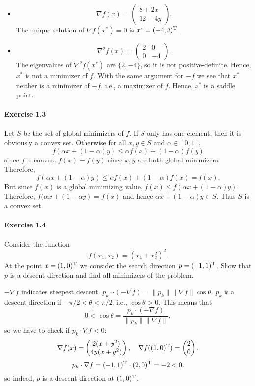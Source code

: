 \begin{itemize}
\item
\[
\nabla f(x) =
\begin{pmatrix}
8 + 2x\\
12 - 4y
\end{pmatrix}.
\]
The unique solution of $\nabla f(x^*) = 0$ is $x^*=(-4,3)^{\text{\upshape T}}$.
\item
\[
\nabla^2 f(x) =
\begin{pmatrix}
2 & 0\\
0 & - 4
\end{pmatrix}.
\]
The eigenvalues of $\nabla^2 f(x^*)$ are $\{2, -4\}$, so it is not positive-definite. Hence, $x^*$ is not a minimizer of $f$. With the same argument for $-f$ we see that $x^*$ neither is a minimizer of $-f$, i.e., a maximizer of $f$. Hence, $x^*$ is a saddle point.

\end{itemize}


\paragraph{Exercise 1.3} %
Let $S$ be the set of global minimizers of $f$. If $S$ only has one element,
then it is obviously a convex set. Otherwise for all $x, y \in S$ and
$\alpha\in [0, 1]$,
\[
f (\alpha x + (1 − \alpha)y) \le \alpha f(x) + (1 − \alpha)f (y)
\]
since $f$ is convex. $f(x) = f(y)$ since $x, y$ are both global minimizers.
Therefore,
\[
f (\alpha x + (1 − \alpha)y) \le \alpha f (x) + (1 − \alpha)f (x) = f (x).
\]
But since $f (x)$ is a global minimizing value, $f (x) \le f (\alpha x + (1 −
\alpha)y)$.  Therefore, $f (\alpha x + (1 − \alpha y) = f (x)$ and hence
$\alpha x + (1 − \alpha )y \in S$. Thus $S$ is a convex set.


\paragraph{Exercise 1.4} %
Consider the function
\[
  f(x_1, x_2) = (x_1+x_2^2)^2.
\]
At the point $x=(1,0)^{\text{\upshape T}}$ we consider the search direction $p=(-1,1)^{\text{\upshape T}}$.
Show that $p$ is a descent direction and find all minimizers of the problem.

$−\nabla f$ indicates steepest descent. $p_k\cdot · (−\nabla f) = \|p_k\| \|\nabla f\| \cos\theta$. $p_k$ is a descent direction if $−\pi/2 < \theta < \pi /2$, i.e., $\cos \theta > 0$. This means that
\[
0 \stackrel{!}{<} \cos\theta = \frac{p_k\cdot (-\nabla f)}{\|p_k\|\|\nabla f\|},
\]
so we have to check if $p_k\cdot\nabla f < 0$:
\[
\nabla f(x) =
\begin{pmatrix}
2(x+y^2)\\
4y(x+y^2)
\end{pmatrix},
\quad
\nabla f((1,0)^{\text{\upshape T}}) =
\begin{pmatrix}
2\\
0
\end{pmatrix}.
\]
\[
p_k \cdot \nabla f
=
(-1, 1)^{\text{\upshape T}} \cdot (2,0)^{\text{\upshape T}} = -2 < 0.
\]
so indeed, $p$ is a descent direction at $(1,0)^{\text{\upshape T}}$.


